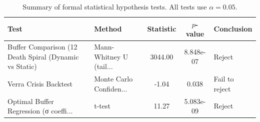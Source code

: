 \begin{table}[t]
\centering
\footnotesize
\begin{tabular}{l l c c l}
\hline
Test & Method & Statistic & $p$-value & Conclusion \\
\hline
Buffer Comparison (12%
Death Spiral (Dynamic vs Static) & Mann-Whitney U (tail... & 3044.00 & 8.848e-07 & Reject \\
Verra Crisis Backtest & Monte Carlo Confiden... & -1.04 & 0.038 & Fail to reject \\
Optimal Buffer Regression (σ coeffi... & t-test & 11.27 & 5.083e-09 & Reject \\
\hline
\end{tabular}
\caption{Summary of formal statistical hypothesis tests. All tests use $\alpha = 0.05$.}
\label{tab:statistical_tests}
\end{table}
